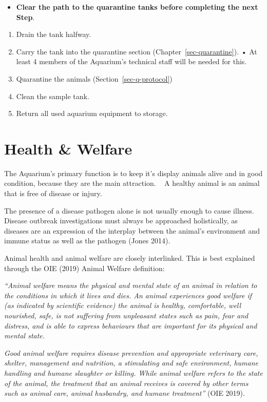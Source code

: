 \documentclass[
  letterpaper,
  DIV=11,
  numbers=noendperiod]{scrreprt}
\providecommand{\tightlist}{%
  \setlength{\itemsep}{0pt}\setlength{\parskip}{0pt}}\usepackage{longtable,booktabs,array}
\begin{document}
\begin{itemize}
\tightlist
\item
  \textbf{Clear the path to the quarantine tanks before completing the
  next Step}.
\end{itemize}

\begin{enumerate}
\def\labelenumi{\arabic{enumi}.}
\setcounter{enumi}{28}
\item
  Drain the tank halfway.
\item
  Carry the tank into the quarantine section
  (Chapter~\ref{sec-quarantine}). • At least 4 members of the Aquarium's
  technical staff will be needed for this.
\item
  Quarantine the animals (Section~\ref{sec-q-protocol})
\item
  Clean the sample tank.
\item
  Return all used aquarium equipment to storage.
\end{enumerate}

\hypertarget{sec-health}{%
\chapter{Health \& Welfare}\label{sec-health}}

The Aquarium's primary function is to keep it's display animals alive
and in good condition, because they are the main attraction. ~ A healthy
animal is an animal that is free of disease or injury.

The presence of a disease pathogen alone is not usually enough to cause
illness. Disease outbreak investigations must always be approached
holistically, as diseases are an expression of the interplay between the
animal's environment and immune status as well as the pathogen (Jones
2014).

Animal health and animal welfare are closely interlinked. This is best
explained through the OIE (2019) Animal Welfare definition:

\emph{``Animal welfare means the physical and mental state of an animal
in relation to the conditions in which it lives and dies. An animal
experiences good welfare if (as indicated by scientific evidence) the
animal is healthy, comfortable, well nourished, safe, is not suffering
from unpleasant states such as pain, fear and distress, and is able to
express behaviours that are important for its physical and mental
state.}

\emph{Good animal welfare requires disease prevention and appropriate
veterinary care, shelter, management and nutrition, a stimulating and
safe environment, humane handling and humane slaughter or killing. While
animal welfare refers to the state of the animal, the treatment that an
animal receives is covered by other terms such as animal care, animal
husbandry, and humane treatment''} (OIE 2019).
\end{document}
